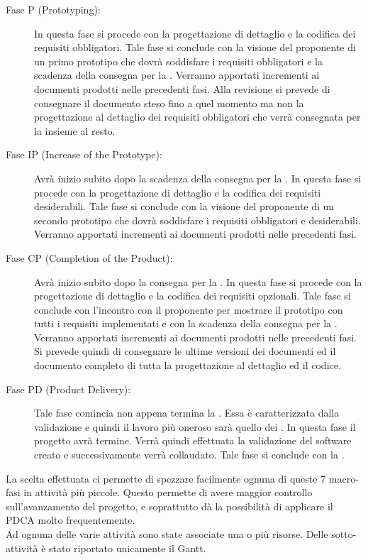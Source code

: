 \begin{description}
			\item[Fase P (Prototyping):] In questa fase si procede con la progettazione di dettaglio e la codifica dei requisiti obbligatori. Tale fase si conclude con la visione del proponente di un primo prototipo che dovrà soddisfare i requisiti obbligatori e la scadenza della consegna per la . Verranno apportati incrementi ai documenti prodotti nelle precedenti fasi. Alla revisione si prevede di consegnare il documento  steso fino a quel momento ma non la progettazione al dettaglio dei requisiti obbligatori che verrà consegnata per la  insieme al resto.
			\item[Fase IP (Increase of the Prototype):] Avrà inizio subito dopo la scadenza della consegna per la . In questa fase si procede con la progettazione di dettaglio e la codifica dei requisiti desiderabili. Tale fase si conclude con la visione del proponente di un secondo prototipo che dovrà soddisfare i requisiti obbligatori e desiderabili. Verranno apportati incrementi ai documenti prodotti nelle precedenti fasi.
			\item[Fase CP (Completion of the Product):] Avrà inizio subito dopo la consegna per la . In questa fase si procede con la progettazione di dettaglio e la codifica dei requisiti opzionali. Tale fase si conclude con l'incontro con il proponente per mostrare il prototipo con tutti i requisiti implementati e con la scadenza della consegna per la . Verranno apportati incrementi ai documenti prodotti nelle precedenti fasi. Si prevede quindi di consegnare le ultime versioni dei documenti ed il documento  completo di tutta la progettazione al dettaglio ed il codice.
			\item[Fase PD (Product Delivery):] Tale fase comincia non appena termina la . Essa è caratterizzata dalla validazione e quindi il lavoro più oneroso sarà quello dei . In questa fase il progetto avrà termine. Verrà quindi effettuata la validazione del software creato e successivamente verrà collaudato. Tale fase si conclude con la .
		\end{description}
		La scelta effettuata ci permette di spezzare facilmente ognuna di queste 7 macro-fasi in attività più piccole. Questo permette di avere maggior controllo sull'avanzamento del progetto, e soprattutto dà la possibilità di applicare il PDCA molto frequentemente.\\Ad ognuna delle varie attività sono state associate una o più risorse. Delle sotto-attività è stato riportato unicamente il Gantt.
